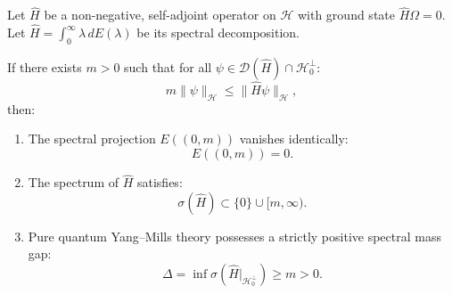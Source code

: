 \begin{theorem}
\label{thm:semigroup_derivative_engine_proof}
Let $\hat{H}$ be a non-negative, self-adjoint operator on $\mathcal{H}$ with ground state $\hat{H}\Omega = 0$. Let $\hat{H} = \int_0^\infty \lambda \, dE(\lambda)$ be its spectral decomposition.

If there exists $m > 0$ such that for all $\psi \in \mathcal{D}(\hat{H}) \cap \mathcal{H}_0^\perp$:
\begin{equation}
\label{eq:engine_spectral_hypothesis}
m \|\psi\|_{\mathcal{H}} \le \|\hat{H} \psi\|_{\mathcal{H}},
\end{equation}
then:
\begin{enumerate}
    \item The spectral projection $E((0, m))$ vanishes identically:
    \begin{equation}
    \label{eq:spectral_projection_zero}
    E((0, m)) = 0.
    \end{equation}
    \item The spectrum of $\hat{H}$ satisfies:
    \begin{equation}
    \label{eq:hamiltonian_spectrum_gap}
    \sigma(\hat{H}) \subset \{0\} \cup [m, \infty).
    \end{equation}
    \item Pure quantum Yang--Mills theory possesses a strictly positive spectral mass gap:
    \begin{equation}
    \Delta = \inf \sigma(\hat{H}|_{\mathcal{H}_0^\perp}) \ge m > 0.
    \end{equation}
\end{enumerate}
\end{theorem}

